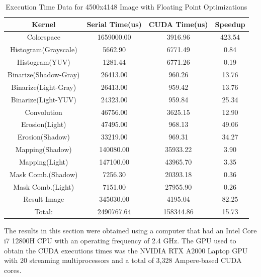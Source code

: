 \documentclass[conference]{IEEEtran}
\begin{document}
      \begin{table}[!t]
      	\renewcommand{\arraystretch}{1.3}
      	\caption{Execution Time Data for 4500x4148 Image with Floating Point Optimizations}
      	\label{table_example}
      	\centering
      	\begin{tabular}{c|c|c|c}
      		\hline
      		\bfseries Kernel & Serial Time(us) & CUDA Time(us) & Speedup \\
      		\hline\hline
      		Colorspace  & 1659000.00 & 3916.96 & 423.54 \\
      		\hline
      		Histogram(Grayscale) & 5662.90 & 6771.49 & 0.84 \\
      		\hline
      		Histogram(YUV) & 1281.44 & 6771.26 & 0.19 \\
      		\hline
      		Binarize(Shadow-Gray) & 26413.00 & 960.26 & 13.76 \\
      		\hline
      		Binarize(Light-Gray) & 26413.00 & 959.42 & 13.76 \\
      		\hline
      		Binarize(Light-YUV) & 24323.00 & 959.84 & 25.34 \\
      		\hline
      		Convolution & 46756.00 & 3625.15 & 12.90 \\
      		\hline
      		Erosion(Light) & 47495.00 & 968.13 & 49.06 \\
      		\hline
      		Erosion(Shadow) & 33219.00 & 969.31 & 34.27 \\
      		\hline
      		Mapping(Shadow) & 140080.00 & 35933.22 & 3.90 \\
      		\hline
      		Mapping(Light) & 147100.00 & 43965.70 & 3.35 \\
      		\hline
      		Mask Comb.(Shadow) & 7256.30 & 20393.18 & 0.36 \\
      		\hline
      		Mask Comb.(Light) & 7151.00 & 27955.90 & 0.26 \\
      		\hline
      		Result Image & 345030.00 & 4195.04 & 82.25 \\
      		\hline
      		Total: & 2490767.64 & 158344.86 & 15.73 \\
      		\hline
      	\end{tabular}
      \end{table}
      The results in this section were obtained using a computer that had an Intel Core i7 12800H CPU with an operating frequency of 2.4 GHz. The GPU used to obtain the CUDA executions times was the NVIDIA RTX A2000 Laptop GPU with 20 streaming multiprocessors and a total of 3,328 Ampere-based CUDA cores.
\end{document}
